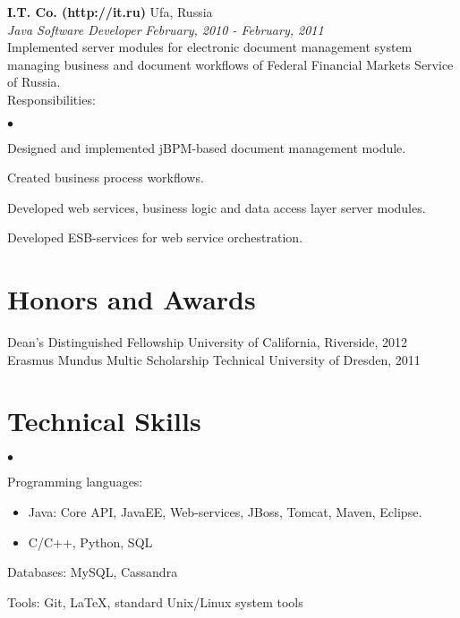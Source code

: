 \documentclass[margin,line]{res}
\newenvironment{list2}{
  \begin{list}{$\bullet$}{%
      \setlength{\itemsep}{0in}
      \setlength{\parsep}{0in} \setlength{\parskip}{0in}
      \setlength{\topsep}{0in} \setlength{\partopsep}{0in} 
      \setlength{\leftmargin}{0.2in}}}{\end{list}}
\begin{document}
\begin{resume}
{\bf I.T. Co. (http://it.ru)} \hfill { Ufa, Russia }\\
{\em Java Software Developer} \hfill {\it February, 2010 - February, 2011}\\
Implemented server modules for electronic document management system managing business and document workflows of Federal Financial Markets Service of Russia.\\
Responsibilities:
\begin{list2}
	\item Designed and implemented jBPM-based document management module.
	\item Created business process workflows.
	\item Developed web services, business logic and data access layer server modules.
	\item Developed ESB-services for web service orchestration.
\end{list2}

\section{\sc Honors and Awards} 
Dean's Distinguished Fellowship \hfill University of California, Riverside, 2012 \\
Erasmus Mundus Multic Scholarship \hfill Technical University of Dresden, 2011 \\

\section{\sc Technical Skills} 
\begin{list2}
\item Programming languages:
	\begin{itemize}[label=$\circ$]
		\item Java:  Core API, JavaEE, Web-services, JBoss, Tomcat, Maven, Eclipse.
		\item C/C++, Python, SQL%
	\end{itemize}
\item Databases: MySQL, Cassandra
\item Tools: Git, \LaTeX, standard Unix/Linux system tools\\ 
\end{list2}


\end{resume}
\end{document}
